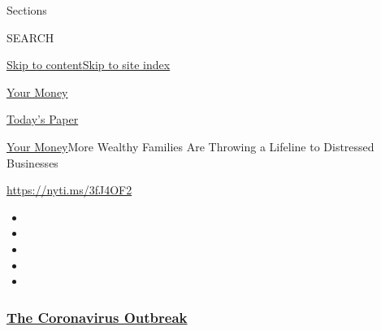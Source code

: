 Sections

SEARCH

\protect\hyperlink{site-content}{Skip to
content}\protect\hyperlink{site-index}{Skip to site index}

\href{https://www.nytimes3xbfgragh.onion/section/your-money}{Your Money}

\href{https://myaccount.nytimes3xbfgragh.onion/auth/login?response_type=cookie\&client_id=vi}{}

\href{https://www.nytimes3xbfgragh.onion/section/todayspaper}{Today's
Paper}

\href{/section/your-money}{Your Money}\textbar{}More Wealthy Families
Are Throwing a Lifeline to Distressed Businesses

\url{https://nyti.ms/3fJ4OF2}

\begin{itemize}
\item
\item
\item
\item
\item
\end{itemize}

\hypertarget{the-coronavirus-outbreak}{%
\subsubsection{\texorpdfstring{\href{https://www.nytimes3xbfgragh.onion/news-event/coronavirus?name=styln-coronavirus-national\&region=TOP_BANNER\&variant=undefined\&block=storyline_menu_recirc\&action=click\&pgtype=Article\&impression_id=1470dab0-e384-11ea-87e8-83b655896aaa}{The
Coronavirus
Outbreak}}{The Coronavirus Outbreak}}\label{the-coronavirus-outbreak}}

